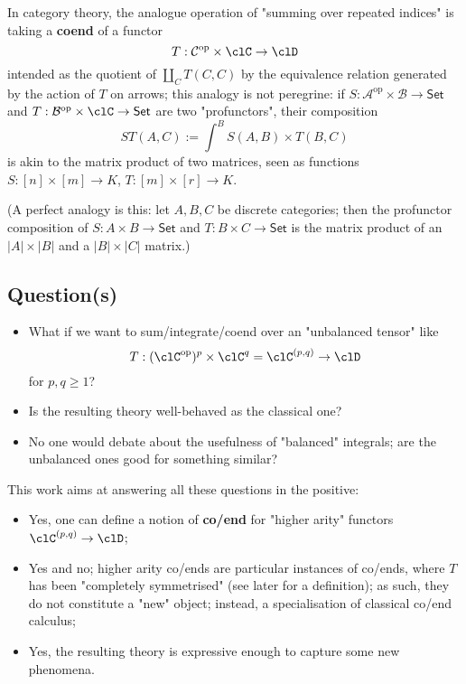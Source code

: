 \documentclass[11pt]{amsart}
\begin{document}
In category theory, the analogue operation of "summing over repeated indices" is taking a \textbf{coend} of a functor 
\[
T : \mathcal{C}^\text{op} \times \clC \to \clD
\] intended as the quotient  of \(\coprod_C T(C,C)\) by the equivalence relation generated by the action of \(T\) on arrows; this analogy is not peregrine: if \(S : \mathcal{A}^\text{op} \times \mathcal{B} \to \mathsf{Set}\) and \(T : \mathcal{B}^\text{op} \times \clC \to \mathsf{Set}\) are two "profunctors", their composition 
\[
ST(A,C) :=  \int^B S(A,B)\times T(B,C)
\] is akin to the matrix product of two matrices, seen as functions \(S : [n]\times [m] \to K\), \(T : [m]\times [r] \to K\).

(A perfect analogy is this: let $A,B,C$ be discrete categories; then the profunctor composition of \(S : A\times B \to \mathsf{Set}\) and \(T : B \times C \to \mathsf{Set}\) is the matrix product of an \(|A|\times |B|\) and a \(|B|\times |C|\) matrix.)

\subsection{Question(s)}
\label{sec:org1c57692}
\begin{itemize}
	\item What if we want to sum/integrate/coend over an "unbalanced tensor" like 
	\[
		T : (\clC^\text{op})^p \times \clC^q = \clC^{(p,q)} \to \clD
		\] for \(p,q\ge 1\)?
\item Is the resulting theory well-behaved as the classical one?
\item No one would debate about the usefulness of "balanced" integrals; are the unbalanced ones good for something similar?
\end{itemize}
		
		This work aims at answering all these questions in the positive:

\begin{itemize}
\item Yes, one can define a notion of \textbf{co/end} for "higher arity" functors \(\clC^{(p,q)} \to \clD\);
\item Yes and no; higher arity co/ends are particular instances of co/ends, where \(T\) has been "completely symmetrised" (see later for a definition); as such, they do not constitute a "new" object; instead, a specialisation of classical co/end calculus;
\item Yes, the resulting theory is expressive enough to capture some new phenomena.
\end{itemize}
\end{document}

